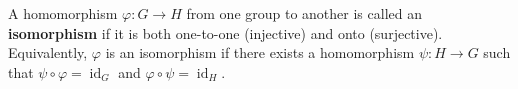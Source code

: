A homomorphism $\varphi: G \to H$ from one group to another is called an \textbf{isomorphism} if it is both one-to-one (injective) and onto (surjective). Equivalently, $\varphi$ is an isomorphism if there exists a homomorphism $\psi: H \to G$ such that $\psi \circ \varphi = \operatorname{id}_G$ and $\varphi \circ \psi = \operatorname{id}_H$.
